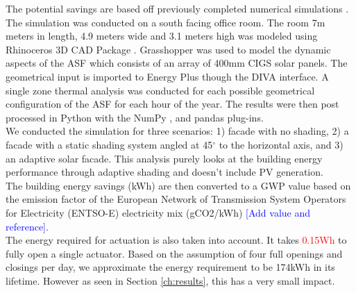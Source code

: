 The potential savings are based off previously completed numerical simulations \cite{jayathissa2015abs}. The simulation was conducted on a south facing office room. The room 7m meters in length, 4.9 meters wide and 3.1 meters high was modeled using Rhinoceros 3D CAD Package \cite{Rhino}. Grasshopper \cite{grasshopper} was used to model the dynamic aspects of the ASF which consists of an array of 400mm CIGS solar panels. The geometrical input is imported to Energy Plus \cite{energyplus} though the DIVA \cite{DIVA} interface. A single zone thermal analysis was conducted for each possible geometrical configuration of the ASF for each hour of the year. The results were then post processed in Python \cite{python} with the NumPy \cite{numpy}, and pandas \cite{pandas} plug-ins.\\

We conducted the simulation for three scenarios: 1) facade with no shading, 2) a facade with a static shading system angled at 45$^{\circ}$ to the horizontal axis, and 3) an adaptive solar facade. This analysis purely looks at the building energy performance through adaptive shading and doesn't include PV generation. \\

The building energy savings (kWh) are then converted to a GWP value based on the emission factor of the European Network of Transmission System Operators for Electricity (ENTSO-E) electricity mix (gCO2/kWh) \textcolor{blue}{[Add value and reference]}. \\

The energy required for actuation is also taken into account. It takes \textcolor{red}{0.15Wh} to fully open a single actuator. Based on the assumption of four full openings and closings per day, we approximate the energy requirement to be 174kWh in its lifetime. However as seen in Section \ref{ch:results}, this has a very small impact.\\

